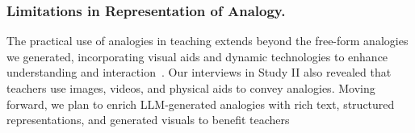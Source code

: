 

\subsubsection{Limitations in Representation of Analogy.}
The practical use of analogies in teaching extends beyond the free-form analogies we generated, incorporating visual aids and dynamic technologies to enhance understanding and interaction~\cite{richland_cognitive_2007,richland_analogy_2015}.
Our interviews in Study II  also revealed that teachers  use images, videos, and physical aids to convey analogies. 
Moving forward, we plan to enrich LLM-generated analogies with rich text, structured representations, and generated visuals to benefit teachers 



